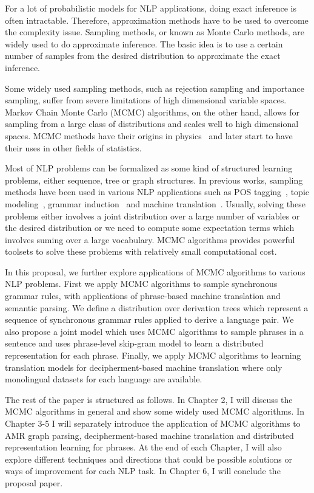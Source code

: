 For a lot of probabilistic models for NLP applications, doing exact inference is often intractable. Therefore, approximation methods have to be used to overcome the
complexity issue. Sampling methods, or known as Monte Carlo methods, are widely used to do approximate inference. The basic idea is to use a certain number of
samples from the desired distribution to approximate the exact inference.


Some widely used sampling methods, such as rejection sampling and importance sampling, suffer from severe limitations of high dimensional variable spaces. Markov Chain Monte Carlo (MCMC)
algorithms, on the other hand, allows for sampling from a large class of distributions and scales well to high dimensional spaces. MCMC methods have their origins in physics~\cite{metropolis1949monte} and later start to have
their uses in other fields of statistics.


Most of NLP problems can be formalized as some kind of structured learning problems, either sequence, tree or graph structures.
In previous works, sampling methods have been used in various NLP applications such as POS tagging~\cite{finkel2005incorporating}, topic modeling~\cite{wallach2006topic,steyvers2007probabilistic}, grammar induction~\cite{cohn-2009-inducing,PostGildea-acl09} and machine translation~\cite{denero2008sampling}. 
Usually, solving these problems either involves a joint distribution over a large number of variables or the desired distribution
or we need to compute some expectation terms which involves suming over a large vocabulary.
MCMC algorithms provides powerful toolsets to solve these problems with relatively small computational cost.


In this proposal, we further explore applications of MCMC algorithms to various NLP problems.
First we apply MCMC algorithms to sample synchronous grammar rules, with applications of phrase-based machine translation and semantic parsing. We define a distribution over derivation trees which represent a sequence of synchronous grammar rules applied to derive a language pair. We also propose a joint model which uses MCMC algorithms to sample phrases in a sentence and uses phrase-level
skip-gram model to learn a distributed representation for each phrase. Finally, we apply MCMC algorithms to learning translation models for decipherment-based machine translation where only monolingual datasets for each language are available.


The rest of the paper is structured as follows. In Chapter 2, I will discuss the MCMC algorithms in general and show some widely used MCMC algorithms. In Chapter 3-5 I will separately introduce the application of MCMC algorithms to 
AMR graph parsing, decipherment-based machine translation and distributed representation learning for phrases. At the end of each Chapter, I will also explore different techniques and directions that
could be possible solutions or ways of improvement for each NLP task. In Chapter 6, I will conclude the proposal paper.

